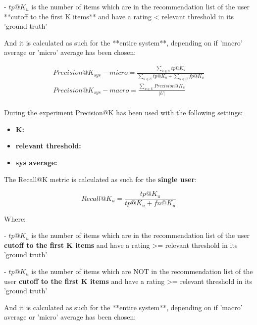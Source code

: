 \documentclass[11pt]{article}
\begin{document}
    - $tp@K_u$ is the number of items which are in the recommendation list of the user
      **cutoff to the first K items** and have a rating < relevant threshold in its 'ground truth'

\hfill\break

And it is calculated as such for the **entire system**, depending on if 'macro' average or 'micro' average has been
chosen:

   \begin{gather*}
       Precision@K_{sys} - micro = \frac{\sum_{u \in U} tp@K_u}{\sum_{u \in U} tp@K_u + \sum_{u \in U} fp@K_u}\\
       Precision@K_{sys} - macro = \frac{\sum_{u \in U} Precision@K_u}{|U|}\\
   \end{gather*}

\hfill\break

During the experiment Precision@K has been used with the following settings:
\begin{itemize}
    \item \textbf{K:  }
    \item \textbf{relevant threshold: }
    \item \textbf{sys average:  }
\end{itemize}


The Recall@K metric is calculated as such for the \textbf{single user}:

    \[
    Recall@K_u = \frac{tp@K_u}{tp@K_u + fn@K_u}
    \]

    Where:

    - $tp@K_u$ is the number of items which are in the recommendation list of the user
      \textbf{cutoff to the first K items} and have a rating >= relevant threshold in its 'ground truth'

    - $tp@K_u$ is the number of items which are NOT in the recommendation list of the user
      \textbf{cutoff to the first K items} and have a rating >= relevant threshold in its 'ground truth'

\hfill\break

And it is calculated as such for the **entire system**, depending on if 'macro' average or 'micro' average has been
chosen:
\end{document}

